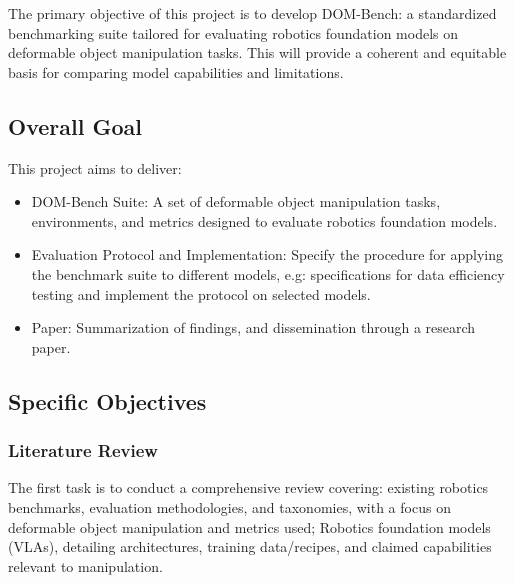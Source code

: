 The primary objective of this project is to develop DOM-Bench: a standardized benchmarking suite tailored for evaluating robotics foundation models on deformable object manipulation tasks. This will provide a coherent and equitable basis for comparing model capabilities and limitations.


\subsection{Overall Goal}

This project aims to deliver:
\begin{itemize}
    \item DOM-Bench Suite: A set of deformable object manipulation tasks, environments, and metrics designed to evaluate robotics foundation models.
    \item Evaluation Protocol and Implementation: Specify the procedure for applying the benchmark suite to different models, e.g: specifications for data efficiency testing and implement the protocol on selected models.
    \item Paper: Summarization of findings, and dissemination through a research paper.
\end{itemize}


\subsection{Specific Objectives}


\subsubsection{Literature Review} %
The first task is to conduct a comprehensive review covering: existing robotics benchmarks, evaluation methodologies, and taxonomies, with a focus on deformable object manipulation and metrics used; Robotics foundation models (VLAs), detailing architectures, training data/recipes, and claimed capabilities relevant to manipulation.


